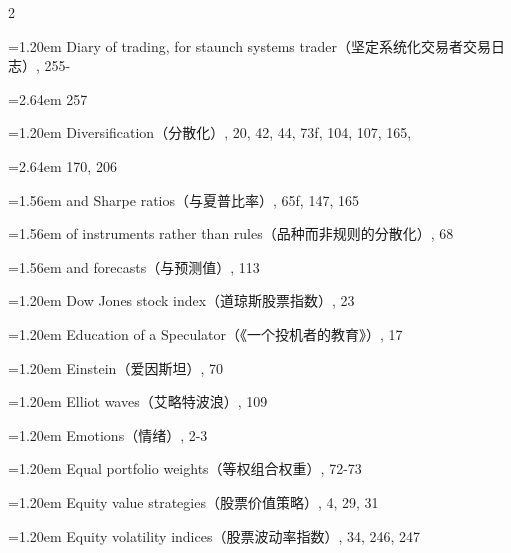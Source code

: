 {\begin{multicols}{2}
\par \noindent\hangindent=1.20em\hspace*{0.00em} Diary of trading, for staunch systems trader（坚定系统化交易者交易日志）, 255-
\par \noindent\hangindent=2.64em\hspace*{1.44em} 257
\par \noindent\hangindent=1.20em\hspace*{0.00em} Diversification（分散化）, 20, 42, 44, 73f, 104, 107, 165,
\par \noindent\hangindent=2.64em\hspace*{1.44em} 170, 206
\par \noindent\hangindent=1.56em\hspace*{0.36em} and Sharpe ratios（与夏普比率）, 65f, 147, 165
\par \noindent\hangindent=1.56em\hspace*{0.36em} of instruments rather than rules（品种而非规则的分散化）, 68
\par \noindent\hangindent=1.56em\hspace*{0.36em} and forecasts（与预测值）, 113
\par \noindent\hangindent=1.20em\hspace*{0.00em} Dow Jones stock index（道琼斯股票指数）, 23
\par \noindent\hangindent=1.20em\hspace*{0.00em} Education of a Speculator（《一个投机者的教育》）, 17
\par \noindent\hangindent=1.20em\hspace*{0.00em} Einstein（爱因斯坦）, 70
\par \noindent\hangindent=1.20em\hspace*{0.00em} Elliot waves（艾略特波浪）, 109
\par \noindent\hangindent=1.20em\hspace*{0.00em} Emotions（情绪）, 2-3
\par \noindent\hangindent=1.20em\hspace*{0.00em} Equal portfolio weights（等权组合权重）, 72-73
\par \noindent\hangindent=1.20em\hspace*{0.00em} Equity value strategies（股票价值策略）, 4, 29, 31
\par \noindent\hangindent=1.20em\hspace*{0.00em} Equity volatility indices（股票波动率指数）, 34, 246, 247

\end{multicols}}
